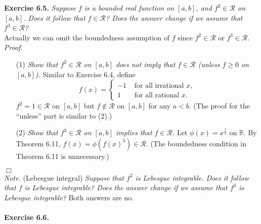 \documentclass{article}
\begin{document}



\textbf{Exercise 6.5.}
\emph{Suppose $f$ is a bounded real function on $[a,b]$,
and $f^2 \in \mathscr{R}$ on $[a,b]$.
Does it follow that $f \in \mathscr{R}$?
Does the answer change if we assume that $f^3 \in \mathscr{R}$?} \\

Actually we can omit the boundedness assumption of $f$
since $f^2 \in \mathscr{R}$ or $f^3 \in \mathscr{R}$. \\

\emph{Proof.}
\begin{enumerate}
\item[(1)]
\emph{Show that $f^2 \in \mathscr{R}$ on $[a,b]$ does not imply that
$f \in \mathscr{R}$ (unless $f \geq 0$ on $[a,b]$).}
Similar to Exercise 6.4,
define
\begin{equation*}
  f(x) =
    \begin{cases}
      -1 & \text{ for all irrational $x$}, \\
      1 & \text{ for all rational $x$}.
    \end{cases}
\end{equation*}
$f^2 = 1 \in \mathscr{R}$ on $[a,b]$ but
$f \not\in \mathscr{R}$ on $[a,b]$ for any $a < b$.
(The proof for the ``unless'' part is similar to (2).)

\item[(2)]
\emph{Show that $f^3 \in \mathscr{R}$ on $[a,b]$ implies that
$f \in \mathscr{R}$.}
Let $\phi(x) = x^{\frac{1}{3}}$ on $\mathbb{R}$.
By Theorem 6.11, $f(x) = \phi(f(x)^3) \in \mathscr{R}$.
(The boundedness condition in Theorem 6.11 is unnecessary.)
\end{enumerate}
$\Box$ \\



\emph{Note.}
(Lebesgue integral)
\emph{Suppose that $f^2$ is Lebesgue integrable.
Does it follow that $f$ is Lebesgue integrable?
Does the answer change if we assume that $f^3$ is Lebesgue integrable?}
Both answers are no. \\\\






\textbf{Exercise 6.6.}
\end{document}
